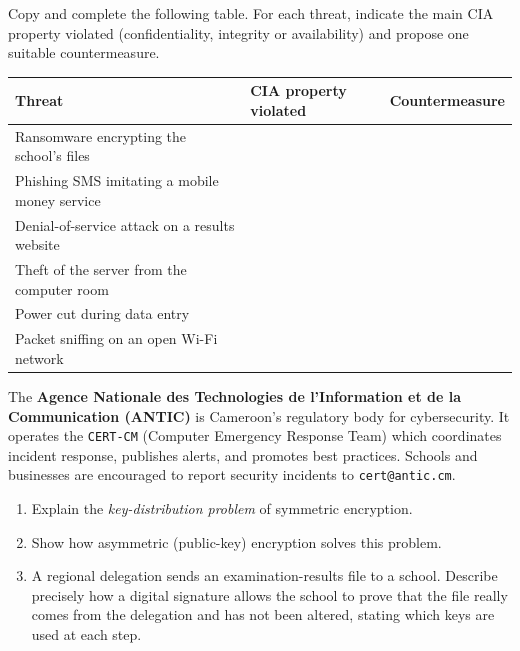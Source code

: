 \documentclass[11pt]{article}
\begin{document}
\begin{exercice}
Copy and complete the following table. For each threat, indicate the main CIA property violated (confidentiality, integrity or availability) and propose one suitable countermeasure.

\begin{center}
\begin{tabularx}{\linewidth}{|l|X|X|}
\hline
\rowcolor{popblueL} \textbf{Threat} & \textbf{CIA property violated} & \textbf{Countermeasure} \\
\hline
Ransomware encrypting the school's files & & \\
\hline
Phishing SMS imitating a mobile money service & & \\
\hline
Denial-of-service attack on a results website & & \\
\hline
Theft of the server from the computer room & & \\
\hline
Power cut during data entry & & \\
\hline
Packet sniffing on an open Wi-Fi network & & \\
\hline
\end{tabularx}
\end{center}
\end{exercice}

\begin{savaistu}
The \textbf{Agence Nationale des Technologies de l'Information et de la Communication (ANTIC)} is Cameroon's regulatory body for cybersecurity. It operates the \texttt{CERT-CM} (Computer Emergency Response Team) which coordinates incident response, publishes alerts, and promotes best practices. Schools and businesses are encouraged to report security incidents to \texttt{cert@antic.cm}.
\end{savaistu}

\begin{exercice}
\begin{enumerate}
\item Explain the \emph{key-distribution problem} of symmetric encryption.
\item Show how asymmetric (public-key) encryption solves this problem.
\item A regional delegation sends an examination-results file to a school. Describe precisely how a digital signature allows the school to prove that the file really comes from the delegation and has not been altered, stating which keys are used at each step.
\end{enumerate}
\end{exercice}
\end{document}
